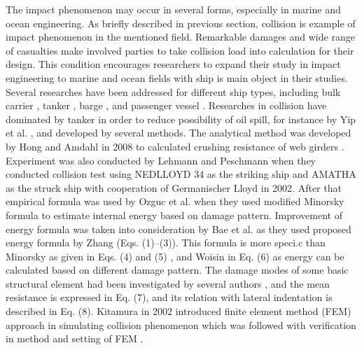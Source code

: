 \documentclass[10pt,journal]{IEEEtran}
\begin{document}
The impact phenomenon may occur in several forms, espe­cially in marine and ocean engineering. As briefly described in previous section, collision is example of impact phenomenon in the mentioned field. 
Remarkable damages and wide range of casualties make involved parties to take collision load into calculation for their design. 
This condition encourages researchers to expand their study in impact engineering to marine and ocean fields with ship is main object in their studies. 
Several researches have been addressed for different ship types, including bulk carrier \cite{ozguc2005comparative}, tanker \cite{haris2013analysis,bae2016numerical}, barge \cite{leheta2014finite}, and passenger vessel \cite{prabowo2016evaluating,prabowo2016energy,prabowo2017analysis,prabowo2017effects}. 
Researches in collision have dominated by tanker in order to reduce possibility of oil spill, for instance by Yip et al. \cite{yip2011effectiveness}, and developed by several methods. 
The analytical method was developed by Hong and Amdahl in 2008 to calcu­lated crushing resistance of web girders \cite{hong2008crushing}. Experiment was also conducted by Lehmann and Peschmann \cite{lehmann2002energy} 
when they conducted collision test using NEDLLOYD 34 as the striking ship and AMATHA as the struck ship with cooperation of Germanischer Lloyd in 2002. After that empirical formula was used by Ozguc et al. \cite{ozguc2005comparative} 
when they used modified Minorsky formula to estimate internal energy based on damage pattern. Improvement of energy formula was taken into consideration by Bae et al. \cite{bae2016study}
as they used proposed energy formula by Zhang (Eqs. (1)–(3)). This formula is more speci.c than Minorsky as given in Eqs. (4) and (5) \cite{minorsky1958analysis}, and Woisin in Eq. (6) \cite{woisin1979design} as energy can be calculated based on different damage pattern. 
The damage modes of some basic structural element had been investigated by several authors \cite{paik1995ultimate,lu1990cutting,wierzbicki1993closed,simonsen1997ship,prabowo2017structural}, and the mean resistance is expressed in Eq. (7), and its relation with lateral indentation is described in Eq. (8). Kitamura 
in 2002 introduced finite element method (FEM) approach in simulating collision phenomenon \cite{kitamura2002fem} which was followed with verification in method and setting of FEM \cite{wisniewski2003effect}. 
\end{document}

